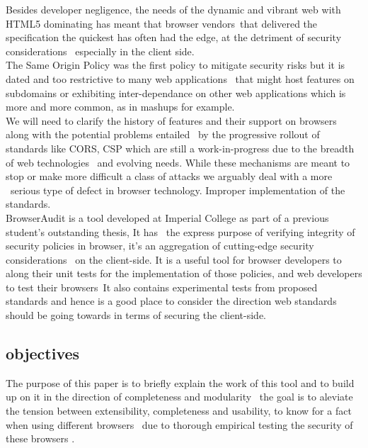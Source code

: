 \documentclass[a4paper,12pt]{report}
\begin{document}
Besides developer negligence, the needs of the dynamic and vibrant web with HTML5 dominating has meant that browser vendors\
that delivered the specification the quickest has often had the edge, at the detriment of security considerations \
especially in the client side.\\

The Same Origin Policy was the first policy to mitigate security risks but it is dated and too restrictive to many web applications \
that might host features on subdomains or exhibiting inter-dependance on other web applications which is more and more common, as in mashups \cite{mashup} for example.\\

We will need to clarify the history of features and their support on browsers along with the potential problems entailed \
by the progressive rollout of standards like CORS, CSP which are still a work-in-progress due to the breadth of web technologies \
and evolving needs. While these mechanisms are meant to stop or make more difficult a class of attacks we arguably deal with a more \
serious type of defect in browser technology. Improper implementation of the standards.\\

BrowserAudit is a tool developed at Imperial College as part of a previous student's outstanding thesis, It has \
the express purpose of verifying integrity of security policies in browser, it's an aggregation of cutting-edge security considerations \ 
on the client-side. 
It is a useful tool for browser developers to along their unit tests for the implementation of those policies, and web developers to test their browsers\
It also contains experimental tests from proposed standards and hence is a good place to consider the direction web standards should be going towards in terms of securing the client-side.\


\subsection{objectives}

The purpose of this paper is to briefly explain the work of this tool and to build up on it in the direction of completeness and modularity \
the goal is to aleviate the tension between extensibility, completeness and usability, to know for a fact when using different browsers \
due to thorough  empirical testing the security of these browsers .\\
\end{document}
